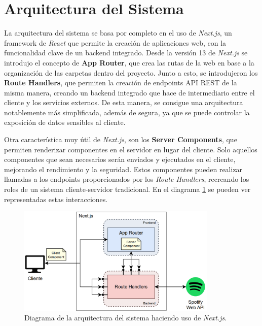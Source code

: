 \section{Arquitectura del Sistema}

La arquitectura del sistema se basa por completo en el uso de \textit{Next.js}, un framework de \textit{React} que permite la creación de aplicaciones web, con la funcionalidad clave de un backend integrado. Desde la versión 13 de \textit{Next.js} se introdujo el concepto de \textbf{App Router}, que crea las rutas de la web en base a la organización de las carpetas dentro del proyecto. Junto a esto, se introdujeron los \textbf{Route Handlers}, que permiten la creación de endpoints API REST de la misma manera, creando un backend integrado que hace de intermediario entre el cliente y los servicios externos. De esta manera, se consigue una arquitectura notablemente más simplificada, además de segura, ya que se puede controlar la exposición de datos sensibles al cliente.

Otra característica muy útil de \textit{Next.js}, son los \textbf{Server Components}, que permiten renderizar componentes en el servidor en lugar del cliente. Solo aquellos componentes que sean necesarios serán enviados y ejecutados en el cliente, mejorando el rendimiento y la seguridad. Estos componentes pueden realizar llamadas a los endpoints proporcionados por los \textit{Route Handlers}, recreando los roles de un sistema cliente-servidor tradicional. En el diagrama \ref{fig:arquitectura_sistema} se pueden ver representadas estas interacciones.

\begin{figure}[H]
    \centering
    \includegraphics[width=0.85\textwidth]{figures/arquitectura_sistema.png}
    \caption{Diagrama de la arquitectura del sistema haciendo uso de \textit{Next.js}.}
    \label{fig:arquitectura_sistema}
\end{figure}

